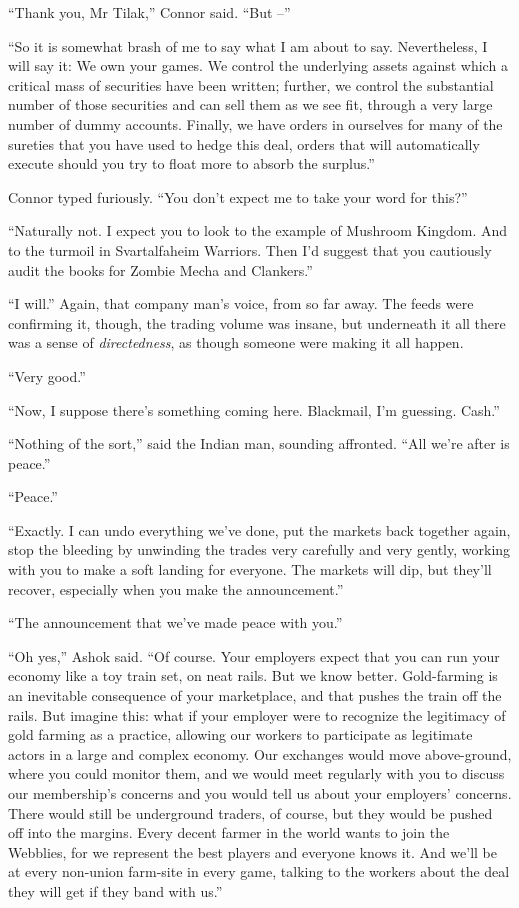 ``Thank you, Mr Tilak,'' Connor said. ``But --''

``So it is somewhat brash of me to say what I am about to say.
Nevertheless, I will say it: We own your games. We control the
underlying assets against which a critical mass of securities have
been written; further, we control the substantial number of those
securities and can sell them as we see fit, through a very large
number of dummy accounts. Finally, we have orders in ourselves for
many of the sureties that you have used to hedge this deal, orders
that will automatically execute should you try to float more to
absorb the surplus.''

Connor typed furiously. ``You don't expect me to take your word for
this?''

``Naturally not. I expect you to look to the example of Mushroom
Kingdom. And to the turmoil in Svartalfaheim Warriors. Then I'd
suggest that you cautiously audit the books for Zombie Mecha and
Clankers.''

``I will.'' Again, that company man's voice, from so far away. The
feeds were confirming it, though, the trading volume was insane,
but underneath it all there was a sense of \emph{directedness}, as
though someone were making it all happen.

``Very good.''

``Now, I suppose there's something coming here. Blackmail, I'm
guessing. Cash.''

``Nothing of the sort,'' said the Indian man, sounding affronted.
``All we're after is peace.''

``Peace.''

``Exactly. I can undo everything we've done, put the markets back
together again, stop the bleeding by unwinding the trades very
carefully and very gently, working with you to make a soft landing
for everyone. The markets will dip, but they'll recover, especially
when you make the announcement.''

``The announcement that we've made peace with you.''

``Oh yes,'' Ashok said. ``Of course. Your employers expect that you
can run your economy like a toy train set, on neat rails. But we
know better. Gold-farming is an inevitable consequence of your
marketplace, and that pushes the train off the rails. But imagine
this: what if your employer were to recognize the legitimacy of
gold farming as a practice, allowing our workers to participate as
legitimate actors in a large and complex economy. Our exchanges
would move above-ground, where you could monitor them, and we would
meet regularly with you to discuss our membership's concerns and
you would tell us about your employers' concerns. There would still
be underground traders, of course, but they would be pushed off
into the margins. Every decent farmer in the world wants to join
the Webblies, for we represent the best players and everyone knows
it. And we'll be at every non-union farm-site in every game,
talking to the workers about the deal they will get if they band
with us.''

